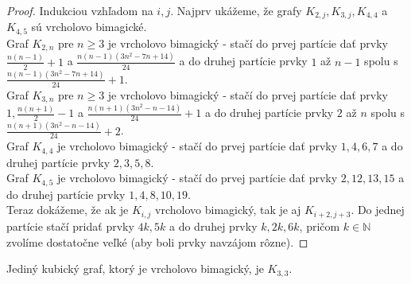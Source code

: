 \begin{proof} Indukciou vzhľadom na $i,j$. Najprv ukážeme, že grafy $K_{2,j}, K_{3,j}, K_{4,4}$ a $K_{4,5}$ sú vrcholovo bimagické. \\

Graf $K_{2,n}$ pre $n \geq 3$ je vrcholovo bimagický - stačí do prvej partície dať prvky $\frac{n(n-1)}{2} + 1$ a $\frac{n(n-1)(3n^2 - 7n + 14)}{24}$ a do druhej partície prvky $1$ až $n - 1$ spolu s $\frac{n(n-1)(3n^2 - 7n + 14)}{24} + 1$. \\

Graf $K_{3,n}$ pre $n \geq 3$ je vrcholovo bimagický - stačí do prvej partície dať prvky $1, \frac{n(n+1)}{2} - 1$ a $\frac{n(n+1)(3n^2 - n - 14)}{24} + 1$ a do druhej partície prvky $2$ až $n$ spolu s $\frac{n(n+1)(3n^2 - n - 14)}{24} + 2$. \\

Graf $K_{4,4}$ je vrcholovo bimagický - stačí do prvej partície dať prvky $1, 4, 6, 7$ a do druhej partície prvky $2, 3, 5, 8$. \\

Graf $K_{4,5}$ je vrcholovo bimagický - stačí do prvej partície dať prvky $2, 12, 13, 15$ a do druhej partície prvky $1, 4, 8, 10, 19$. \\

Teraz dokážeme, že ak je $K_{i,j}$ vrcholovo bimagický, tak je aj $K_{i+2,j+3}$. Do jednej partície stačí pridať prvky $4k, 5k$ a do druhej prvky $k, 2k, 6k$, pričom $k \in \mathbb{N}$ zvolíme dostatočne veľké (aby boli prvky navzájom rôzne).
\end{proof}

\begin{subtheorem} Jediný kubický graf, ktorý je vrcholovo bimagický, je $K_{3,3}$.
\end{subtheorem}

